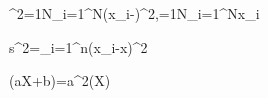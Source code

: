 \sigma^2=\frac1N\sum_{i=1}^N(x_i-\mu)^2,\qquad \mu=\frac1N\sum_{i=1}^Nx_i

s^2=\sum_{i=1}^n(x_i-\overline x)^2

(aX+b)=a^2(X)
